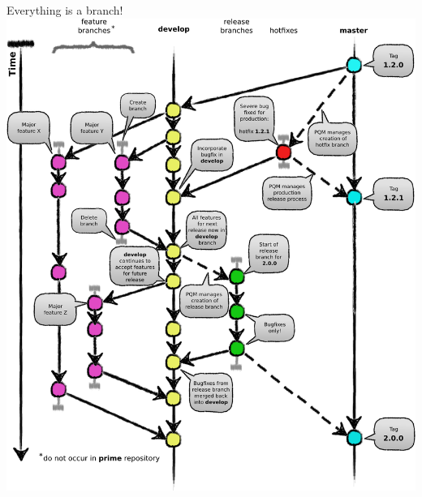 


\begin{frame}{Everything is a branch!}
	\includegraphics[height=0.9\textheight, width=\textwidth]{gitflow}
\end{frame}

